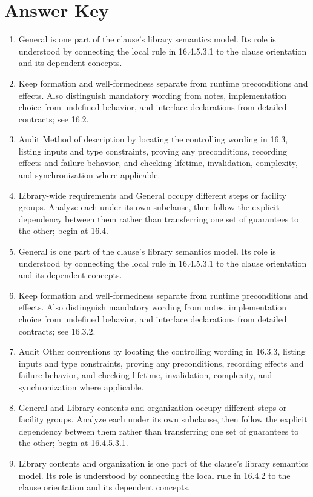\documentclass[11pt,letterpaper]{article}
\begin{document}
\clearpage\section{Answer Key}
\begin{enumerate}
\item General is one part of the clause's library semantics model. Its role is understood by connecting the local rule in 16.4.5.3.1 to the clause orientation and its dependent concepts.
\item Keep formation and well-formedness separate from runtime preconditions and effects. Also distinguish mandatory wording from notes, implementation choice from undefined behavior, and interface declarations from detailed contracts; see 16.2.
\item Audit Method of description by locating the controlling wording in 16.3, listing inputs and type constraints, proving any preconditions, recording effects and failure behavior, and checking lifetime, invalidation, complexity, and synchronization where applicable.
\item Library-wide requirements and General occupy different steps or facility groups. Analyze each under its own subclause, then follow the explicit dependency between them rather than transferring one set of guarantees to the other; begin at 16.4.
\item General is one part of the clause's library semantics model. Its role is understood by connecting the local rule in 16.4.5.3.1 to the clause orientation and its dependent concepts.
\item Keep formation and well-formedness separate from runtime preconditions and effects. Also distinguish mandatory wording from notes, implementation choice from undefined behavior, and interface declarations from detailed contracts; see 16.3.2.
\item Audit Other conventions by locating the controlling wording in 16.3.3, listing inputs and type constraints, proving any preconditions, recording effects and failure behavior, and checking lifetime, invalidation, complexity, and synchronization where applicable.
\item General and Library contents and organization occupy different steps or facility groups. Analyze each under its own subclause, then follow the explicit dependency between them rather than transferring one set of guarantees to the other; begin at 16.4.5.3.1.
\item Library contents and organization is one part of the clause's library semantics model. Its role is understood by connecting the local rule in 16.4.2 to the clause orientation and its dependent concepts.

\end{enumerate}
\end{document}
